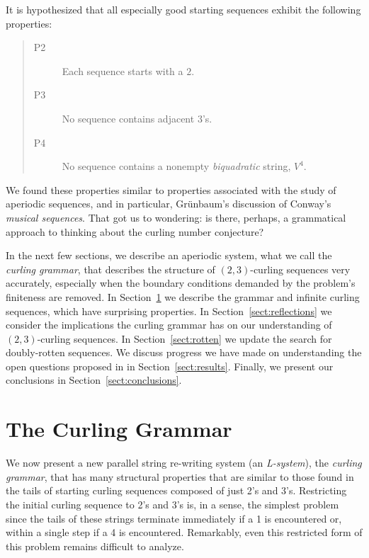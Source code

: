 \documentclass[11pt]{article}
\def\emph#1{{\em #1\/}}
\def\term#1{\emph{#1}}
\def\ni{\noindent}
\def\twth{$(2,3)$}
\begin{document}
It is hypothesized that all especially good starting sequences exhibit
the following properties:
\begin{quote}
\begin{description}
\item[P2] Each sequence starts with a $2$.
\item[P3] No sequence contains adjacent $3$'s.
\item[P4] No sequence contains a nonempty \term{biquadratic} string, $V^4$.
\end{description}
\end{quote}
\ni We found these properties similar to properties associated with the study
of aperiodic sequences, and in particular, Gr\"unbaum's discussion of Conway's
\term{musical sequences}.  That got us to wondering: is there, perhaps, a
grammatical approach to thinking about the curling number conjecture?

In the next few sections, we describe an aperiodic system, what we call the
\term{curling grammar}, that describes the structure of \twth-curling sequences very
accurately, especially when the boundary conditions demanded by the problem's
finiteness are removed.  In Section~\ref{sect:ABg} we describe the grammar
and infinite curling sequences, which have surprising properties.  In
Section~\ref{sect:reflections} we consider the implications the curling
grammar has on our understanding of \twth-curling sequences.
In Section~\ref{sect:rotten} we update the search for doubly-rotten sequences.
We discuss progress we have made on understanding the open questions proposed
in \cite{Ch13} in Section~\ref{sect:results}.  Finally, we present our
conclusions in Section~\ref{sect:conclusions}.

\section{The Curling Grammar}\label{sect:ABg}
We now present a new parallel string re-writing system (an \term{L-system}), the \term{curling grammar}, that has many structural properties
that are similar to those found in the tails of starting curling sequences
composed of just 2's and 3's. Restricting the initial curling sequence to 
2's and 3's is, in a sense, the simplest problem since the tails of these
strings terminate immediately if a 1 is encountered or, within a single step
if a 4 is encountered.  Remarkably, even this restricted form of this problem
remains difficult to analyze.
\end{document}
